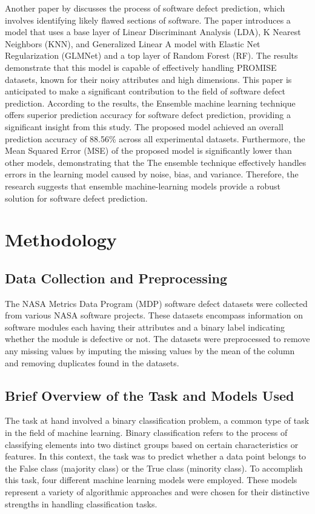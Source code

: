\documentclass[12pt]{report}
\begin{document}
Another paper by\cite{dada2021ensemble} discusses the process of software
defect prediction, which involves identifying likely flawed sections of
software. The paper introduces a model that uses a base layer of Linear
Discriminant Analysis (LDA), K Nearest Neighbors (KNN), and Generalized Linear
A model with Elastic Net Regularization (GLMNet) and a top layer of Random
Forest (RF). The results demonstrate that this model is capable of effectively
handling PROMISE datasets, known for their noisy attributes and high
dimensions. This paper is anticipated to make a significant contribution to the
field of software defect prediction. According to the results, the Ensemble
machine learning technique offers superior prediction accuracy for software
defect prediction, providing a significant insight from this study. The
proposed model achieved an overall prediction accuracy of 88.56\% across all
experimental datasets. Furthermore, the Mean Squared Error (MSE) of the
proposed model is significantly lower than other models, demonstrating that the
The ensemble technique effectively handles errors in the learning model caused
by noise, bias, and variance. Therefore, the research suggests that ensemble
machine-learning models provide a robust solution for software defect
prediction.

\chapter*{Methodology}
\section*{Data Collection and Preprocessing}
The NASA Metrics Data Program (MDP) software defect datasets were collected from
various NASA software projects. These datasets encompass information on software
modules each having their attributes and a binary label indicating whether the
module is defective or not. The datasets were preprocessed to remove any
missing values by imputing the missing values by the mean of the column
and removing duplicates found in the datasets.

\section*{Brief Overview of the Task and Models Used}
The task at hand involved a binary classification problem, a common type of
task in the field of machine learning. Binary classification refers to the
process of classifying elements into two distinct groups based on certain
characteristics or features. In this context, the task was to predict whether a
data point belongs to the False class (majority class) or the True class (minority class). To
accomplish this task, four different machine learning models were employed.
These models represent a variety of algorithmic approaches and were chosen for
their distinctive strengths in handling classification tasks.
\end{document}
